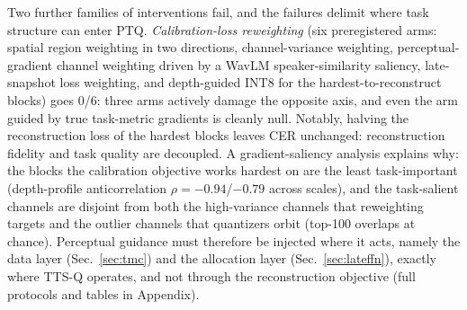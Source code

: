 Two further families of interventions fail, and the failures delimit where task structure can enter PTQ. \emph{Calibration-loss reweighting} (six preregistered arms: spatial region weighting in two directions, channel-variance weighting, perceptual-gradient channel weighting driven by a WavLM speaker-similarity saliency, late-snapshot loss weighting, and depth-guided INT8 for the hardest-to-reconstruct blocks) goes 0/6: three arms actively damage the opposite axis, and even the arm guided by true task-metric gradients is cleanly null. Notably, halving the reconstruction loss of the hardest blocks leaves \hard{} CER unchanged: reconstruction fidelity and task quality are decoupled. A gradient-saliency analysis explains why: the blocks the calibration objective works hardest on are the least task-important (depth-profile anticorrelation $\rho=-0.94$/$-0.79$ across scales), and the task-salient channels are disjoint from both the high-variance channels that reweighting targets and the outlier channels that quantizers orbit (top-100 overlaps at chance). Perceptual guidance must therefore be injected where it acts, namely the data layer (Sec.~\ref{sec:tmc}) and the allocation layer (Sec.~\ref{sec:lateffn}), exactly where TTS-Q operates, and not through the reconstruction objective (full protocols and tables in Appendix).
